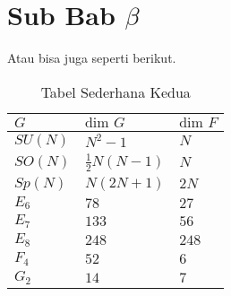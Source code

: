 \section{Sub Bab \texorpdfstring{$\beta$}{ꞵ}}
\noindent Atau bisa juga seperti berikut.
\begin{table}[H]
  \caption{Tabel Sederhana Kedua}
  \label{co:tabel2}
  \begin{center}
    \begin{tabularx}{0.8\textwidth} {
      |>{\raggedright\arraybackslash}X
      |>{\raggedright\arraybackslash}X
      |>{\raggedright\arraybackslash}X
      |}
      \hline
      $G$     & $\text{dim }G$      & $\text{dim }F$ \\
      \hline
      $SU(N)$ & $N^2 -1$            & $N$            \\
      $SO(N)$ & $\frac{1}{2}N(N-1)$ & $N$            \\
      $Sp(N)$ & $N(2N+1)$           & $2N$           \\
      $E_6$   & $78$                & $27$           \\
      $E_7$   & $133$               & $56$           \\
      $E_8$   & $248$               & $248$          \\
      $F_4$   & $52$                & $6$            \\
      $G_2$   & $14$                & $7$            \\
      \hline
    \end{tabularx}
  \end{center}
\end{table}
